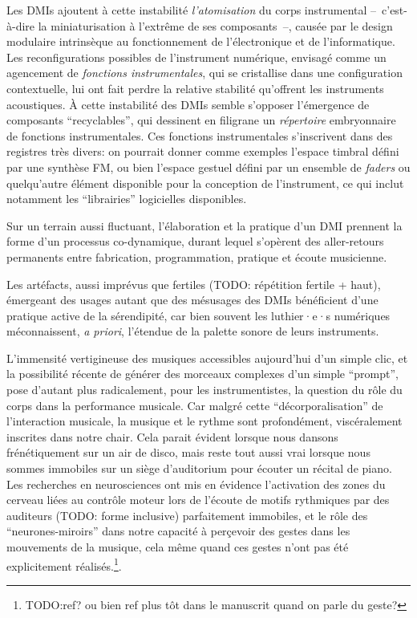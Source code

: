 Les \glspl{DMI} ajoutent à cette instabilité \textit{l'atomisation} du corps instrumental --~c'est-à-dire la miniaturisation à l'extrême de ses composants~--, causée par le design modulaire intrinsèque au fonctionnement de l'électronique et de l'informatique. Les reconfigurations possibles de l'instrument numérique, envisagé comme un agencement de \textit{fonctions instrumentales}, qui se cristallise dans une configuration contextuelle, lui ont fait perdre la relative stabilité qu'offrent les instruments acoustiques. À cette instabilité des \glspl{DMI} semble s'opposer l'émergence de composants ``recyclables'', qui dessinent en filigrane un \textit{répertoire} embryonnaire de fonctions instrumentales. Ces fonctions instrumentales s'inscrivent dans des registres très divers: on pourrait donner comme exemples l'espace timbral défini par une synthèse FM, ou bien l'espace gestuel défini par un ensemble de \textit{faders} ou quelqu'autre élément disponible pour la conception de l'instrument, ce qui inclut notamment les ``librairies'' logicielles disponibles. 

\indent Sur un terrain aussi fluctuant, l'élaboration et la pratique d'un \gls{DMI} prennent la forme d'un processus co-dynamique, durant lequel s'opèrent des aller-retours permanents entre fabrication, programmation, pratique et écoute musicienne.

Les artéfacts, aussi imprévus que fertiles (TODO: répétition fertile + haut), émergeant des usages autant que des mésusages des \glspl{DMI} bénéficient d'une pratique active de la sérendipité, car bien souvent les luthier·e·s numériques méconnaissent, \textit{a priori}, l'étendue de la palette sonore de leurs instruments.

L'immensité vertigineuse des musiques accessibles aujourd'hui d'un simple clic, et la possibilité récente de générer des morceaux complexes d'un simple ``prompt'', pose d'autant plus radicalement, pour les instrumentistes, la question du rôle du corps dans la performance musicale. Car malgré cette ``décorporalisation'' de l'interaction musicale, la musique et le rythme sont profondément, viscéralement inscrites dans notre chair. Cela parait évident lorsque nous dansons frénétiquement sur un air de disco, mais reste tout aussi vrai lorsque nous sommes immobiles sur un siège d'auditorium pour écouter un récital de piano. Les recherches en neurosciences ont mis en évidence l'activation des zones du cerveau liées au contrôle moteur lors de l'écoute de motifs rythmiques par des auditeurs (TODO: forme inclusive) parfaitement immobiles, et le rôle des ``neurones-miroirs'' dans notre capacité à perçevoir des gestes dans les mouvements de la musique, cela même quand ces gestes n'ont pas été explicitement réalisés.\footnote{TODO:ref? ou bien ref plus tôt dans le manuscrit quand on parle du geste?}.\\

